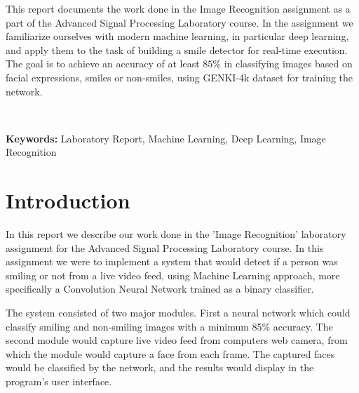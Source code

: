 \documentclass[12pt,a4paper,english
]{tunithesis}
\begin{document}
\vspace{0.5cm}


\noindent
This report documents the work done in the Image Recognition assignment as a part of the Advanced Signal Processing Laboratory course. In the assignment we familiarize ourselves with modern machine learning, in particular deep learning, and apply them to the task of building a smile detector for real-time execution. The goal is to achieve an accuracy of at least $85 \%$ in classifying images based on facial expressions, smiles or non-smiles, using GENKI-4k dataset for training the network.


~

\noindent\textbf{Keywords:} Laboratory Report, Machine Learning, Deep Learning, Image Recognition




\setcounter{tocdepth}{3}              %
\tableofcontents                      %


\if@twoside
\cleardoublepage
\fi


\renewcommand{\chaptername}{} %


\chapter{Introduction}
\label{ch:intro}
In this report we describe our work done in the 'Image Recognition' laboratory assignment for the Advanced Signal Processing Laboratory course. In this assignment we were to implement a system that would detect if a person was smiling or not from a live video feed, using Machine Learning approach, more specifically a Convolution Neural Network trained as a binary classifier.

The system consisted of two major modules. First a neural network which could classify smiling and non-smiling images with a minimum 85\% accuracy. The second module would capture live video feed from computers web camera, from which the module would capture a face from each frame. The captured faces would be classified by the network, and the results would display in the program's user interface.
\end{document}
